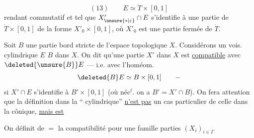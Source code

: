 \[
(13)\qquad E\simeq\dot T\times[0,1]
\]
rendant commutatif
et tel que $X'_{\unsure{*|\varepsilon}}\cap E$ s'identifie à une partie
de $\dot T\times[0,1]$ de la forme $X'_0\times[0,1]$, où $X'_0$
est une partie fermée de $\dot T$.

Soit $B$ une partie bord stricte de l'espace
topologique $X$. Considérons un vois.
cylindrique $E$  $B$ dans $X$. On
dit qu'une partie  $X'$ dans $X$ est \uline{compatible}
avec $\deleted{\unsure{B}}E$ --- i.e. avec l'homéom.
\[
\deleted{B}E\simeq B\times[0,1]\qquad -
\]
si $X'\cap E$ s'identifie à $B'\times[0,1]$
(où néc$^t$. on a $B'=X'\cap B$).
On fera attention que la définition dans la
``
 cylindrique'' \uline{n'est pas} un cas
particulier de celle dans la 
cônique, \uline{mais est}

On définit de $=$ la compatibilité pour
une famille   parties $(X_i)_{i\in I}$.
